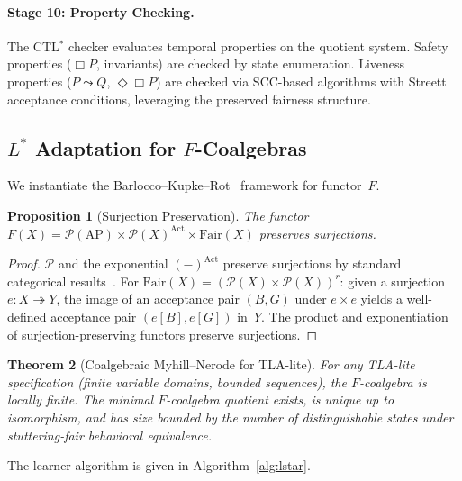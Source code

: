 \documentclass[11pt]{article}
\newtheorem{theorem}{Theorem}
\newtheorem{proposition}[theorem]{Proposition}
\newcommand{\Pow}{\mathcal{P}}
\newcommand{\Fair}{\ensuremath{\mathrm{Fair}}}
\newcommand{\Act}{\ensuremath{\mathrm{Act}}}
\newcommand{\AP}{\ensuremath{\mathrm{AP}}}
\begin{document}
\paragraph{Stage 10: Property Checking.}
The CTL$^*$ checker evaluates temporal properties on the quotient system.
Safety properties ($\Box P$, invariants) are checked by state enumeration.
Liveness properties ($P \leadsto Q$, $\Diamond\Box P$) are checked via
SCC-based algorithms with Streett acceptance conditions, leveraging the
preserved fairness structure.

\subsection{$L^*$ Adaptation for $F$-Coalgebras}

We instantiate the Barlocco--Kupke--Rot~\cite{BarloccoKR19} framework for
functor~$F$.

\begin{proposition}[Surjection Preservation]
\label{prop:surj}
The functor $F(X) = \Pow(\AP) \times \Pow(X)^{\Act} \times \Fair(X)$
preserves surjections.
\end{proposition}

\begin{proof}
$\Pow$ and the exponential $(\mathord{-})^{\Act}$ preserve surjections by
standard categorical results~\cite{Rutten00}.
For $\Fair(X) = (\Pow(X) \times \Pow(X))^r$: given a surjection
$e : X \twoheadrightarrow Y$, the image of an acceptance pair $(B, G)$
under $e \times e$ yields a well-defined acceptance pair $(e[B], e[G])$
in~$Y$.
The product and exponentiation of surjection-preserving functors preserve
surjections.
\end{proof}

\begin{theorem}[Coalgebraic Myhill--Nerode for TLA-lite]
\label{thm:mn}
For any TLA-lite specification (finite variable domains, bounded sequences),
the $F$-coalgebra is locally finite.
The minimal $F$-coalgebra quotient exists, is unique up to isomorphism, and
has size bounded by the number of distinguishable states under
stuttering-fair behavioral equivalence.
\end{theorem}

The learner algorithm is given in Algorithm~\ref{alg:lstar}.
\end{document}
